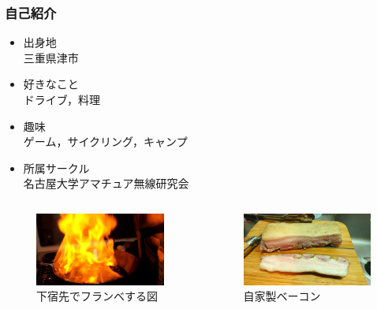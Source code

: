 


\captionsetup[figure]{labelformat=empty,labelsep=none}
\begin{frame}
    \frametitle{自己紹介}
    \begin{itemize}
        \item 出身地\\
            三重県津市
        \item 好きなこと\\
            ドライブ，料理
        \item 趣味\\
            ゲーム，サイクリング，キャンプ
        \item 所属サークル\\
            名古屋大学アマチュア無線研究会
    \end{itemize}
    \begin{columns}
        \begin{column}{0.48\textwidth}
            \begin{figure}[htbp]
                \begin{center}
                    \includegraphics[width=50mm]{pic/pic1.jpg}
                \end{center}
                \caption{下宿先でフランベする図}
            \end{figure}
        \end{column}
        \begin{column}{0.48\textwidth}
            \begin{figure}[htbp]
                \begin{center}
                    \includegraphics[width=50mm]{pic/pic2.jpg}
                \end{center}
                \caption{自家製ベーコン}
            \end{figure}
        \end{column}
    \end{columns}
\end{frame}

